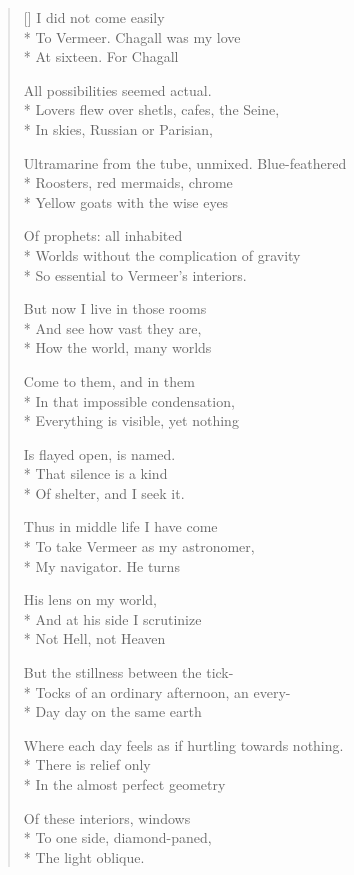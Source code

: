 \label{ch:camera_obscura}
\settowidth{\versewidth}{Where each day feels as if hurtling towards nothing.}
\begin{verse}[\versewidth]
I did not come easily\\*
To Vermeer.  Chagall was my love\\*
At sixteen. For Chagall

All possibilities seemed actual.\\*
Lovers flew over shetls, cafes, the Seine,\\*
In skies, Russian or Parisian,

Ultramarine from the tube, unmixed.  Blue-feathered\\*
Roosters, red mermaids, chrome\\*
Yellow goats with the wise eyes

Of prophets: all inhabited\\*
Worlds without the complication of gravity\\*
So essential to Vermeer's interiors.

But now I live in those rooms\\*
And see how vast they are,\\*
How the world, many worlds

Come to them, and in them\\*
In that impossible condensation,\\*
Everything is visible, yet nothing

Is flayed open, is named. \\*
That silence is a kind \\*
Of shelter, and I seek it.

Thus in middle life I have come\\*
To take Vermeer as my astronomer,\\*
My navigator.   He turns

His lens on my world,\\*
And at his side I scrutinize\\*
Not Hell, not Heaven

But the stillness between the tick-\\*
Tocks of an ordinary afternoon, an every-\\*
Day day on the same earth

Where each day feels as if hurtling towards nothing.\\*
There is relief only\\*
In the almost perfect geometry

Of these interiors, windows\\*
To one side, diamond-paned,\\*
The light oblique.
\end{verse}
